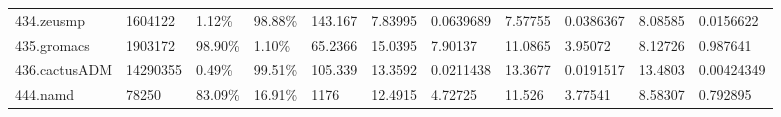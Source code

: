 \documentclass[11pt]{article}
\begin{document}
\begin{landscape}
\begin{table}
\begin{tabular}{lllllllllll}
434.zeusmp                                                                                & 1604122                                                                                      & 1.12\%                                                                                          & 98.88\%                                                                                          & 143.167                                                                                          & 7.83995                           & 0.0639689                         & 7.57755                           & 0.0386367                         & 8.08585                           & 0.0156622                         \\
435.gromacs                                                                               & 1903172                                                                                      & 98.90\%                                                                                         & 1.10\%                                                                                           & 65.2366                                                                                          & 15.0395                           & 7.90137                           & 11.0865                           & 3.95072                           & 8.12726                           & 0.987641                          \\
436.cactusADM                                                                             & 14290355                                                                                     & 0.49\%                                                                                          & 99.51\%                                                                                          & 105.339                                                                                          & 13.3592                           & 0.0211438                         & 13.3677                           & 0.0191517                         & 13.4803                           & 0.00424349                        \\
444.namd                                                                                  & 78250                                                                                        & 83.09\%                                                                                         & 16.91\%                                                                                          & 1176                                                                                             & 12.4915                           & 4.72725                           & 11.526                            & 3.77541                           & 8.58307                           & 0.792895                          \\

\end{tabular}
\end{table}
\end{landscape}
\end{document}
